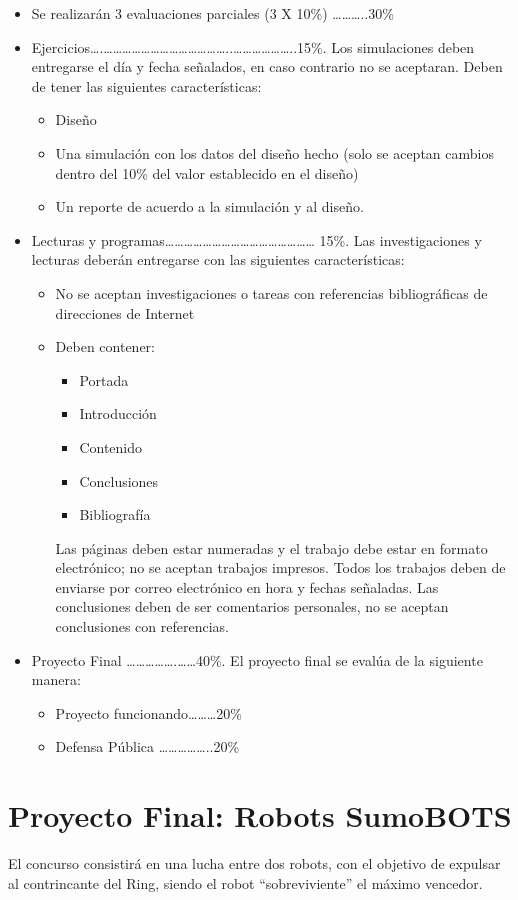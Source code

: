 \documentclass[12pt]{book}
\theoremstyle{definition}
\theoremstyle{remark}
\theoremstyle{plain}
\begin{document}
\begin{itemize}
 \item Se realizarán 3 evaluaciones parciales (3 X 10\%) ………..30\%
 \item Ejercicios….…………………………………..………………..15\%. Los simulaciones deben entregarse el día y fecha señalados, 
en caso contrario no se aceptaran. Deben de tener las siguientes características:
      \begin{itemize}
	\item Diseño
	\item Una simulación con los datos del diseño hecho (solo se aceptan cambios dentro del 10\% del valor establecido en el diseño)
	\item Un reporte de acuerdo a la simulación y al diseño.
      \end{itemize}
 \item Lecturas y programas…………………………………………         15\%. Las investigaciones y lecturas deberán entregarse con las siguientes características:
      \begin{itemize}
	\item No se aceptan investigaciones o tareas con referencias bibliográficas de direcciones de Internet
	\item Deben contener:
	    \begin{itemize}
	      \item Portada
	      \item Introducción
	      \item Contenido
	      \item Conclusiones
	      \item Bibliografía
	    \end{itemize}
	Las páginas deben estar numeradas y el trabajo debe estar en formato electrónico; no se aceptan trabajos impresos. Todos los 
	trabajos deben de enviarse por correo electrónico en hora y fechas señaladas. Las conclusiones deben de ser comentarios personales, 
	no se aceptan conclusiones con referencias. 
      \end{itemize}
 \item Proyecto Final …………….……40\%. El proyecto final se evalúa de la siguiente manera:
      \begin{itemize}
	\item Proyecto funcionando………20\%
	\item Defensa Pública ……………..20\%
      \end{itemize}
\end{itemize}

 \section{Proyecto Final: Robots SumoBOTS }
El concurso consistirá en una lucha entre dos robots, con el objetivo de expulsar al contrincante del Ring, siendo el robot “sobreviviente” el máximo vencedor. 
\end{document}
